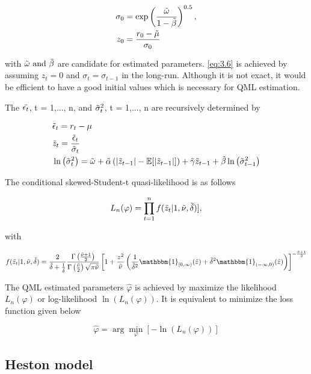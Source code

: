 \documentclass[12pt,a4paper]{article}
\numberwithin{equation}{section}
\begin{document}
\begin{align}
\sigma_{0} &= \exp \left( \frac{\Tilde{\omega}}{1-\Tilde{\beta}} \right)^{0.5}, \label{eq:3.6}\\
z_{0} &= \frac{r_{0} - \Tilde{\mu}}{\sigma_{0}}
\end{align}

with $\Tilde{\omega} \text{ and } \Tilde{\beta}$ are candidate for estimated parameters. \eqref{eq:3.6} is achieved by assuming $z_t = 0$ and $\sigma_t = \sigma_{t-1}$ in the long-run. Although it is not exact, it would be efficient to have a good initial values which is necessary for QML estimation.

The $\Tilde{\epsilon_t}$, t = 1,..., n, and $\Tilde{\sigma}^2_t$, t = 1,..., n are recursively determined by

\begin{align*}
& \Tilde{\epsilon}_t = r_t - \mu \\
& \Tilde{z}_t = \frac{\Tilde{\epsilon}_t}{\Tilde{\sigma}_t}\\
 &\ln\left(\Tilde{\sigma}_t^2\right) = \Tilde{\omega} + \Tilde{\alpha} \left( |\Tilde{z}_{t-1}| - \mathbb{E}[|\Tilde{z}_{t-1}|] \right) + \Tilde{\gamma} \Tilde{z}_{t-1} +  \Tilde{\beta} \ln\left(\Tilde{\sigma}_{t-1}^2\right)
\end{align*}

The conditional skewed-Student-t quasi-likelihood is as follows

\[L_n(\varphi) = \prod_{t=1}^{n} f(\Tilde{z}_t|1, \Tilde{\nu}, \Tilde{\delta})], \]

with

\[f(\Tilde{z}_t|1, \Tilde{\nu}, \Tilde{\delta}) = \frac{2}{\Tilde{\delta}+ \frac{1}{\Tilde{\delta}}} \frac{\Gamma\left(\frac{\Tilde{\nu} + 1}{2}\right)}{\Gamma\left(\frac{\Tilde{\nu}}{2}\right) \sqrt{\pi \Tilde{\nu}}}
\left[ 1 + \frac{z^2}{\Tilde{\nu}} \left( \frac{1}{\Tilde{\delta}^2} \mathbbm{1}_{[0, \infty)} (\Tilde{z}) + \Tilde{\delta}^2 \mathbbm{1}_{(-\infty, 0)} (\Tilde{z}) \right) \right]^{-\frac{\Tilde{\nu} + 1}{2}}
\]

The QML estimated parameters $\hat{\varphi}$ is achieved by maximize the likelihood $L_n(\varphi)$ or log-likelihood $\ln(L_n(\varphi))$. It is equivalent to minimize the loss function given below

\[\hat{\varphi} = \arg\min_\varphi \left [ - \ln(L_n(\varphi)) \right] \]


\subsection{Heston model}
\end{document}
